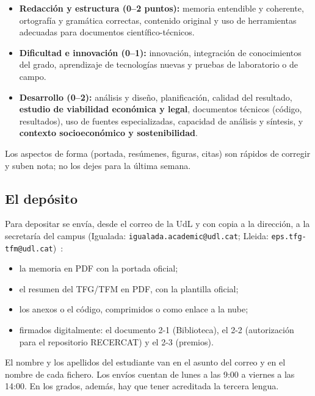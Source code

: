 \documentclass[11pt,a4paper]{article}
\begin{document}
\begin{itemize}
  \item \textbf{Redacción y estructura (0--2 puntos):} memoria entendible y
        coherente, ortografía y gramática correctas, contenido original y uso
        de herramientas adecuadas para documentos científico-técnicos.
  \item \textbf{Dificultad e innovación (0--1):} innovación, integración de
        conocimientos del grado, aprendizaje de tecnologías nuevas y pruebas de
        laboratorio o de campo.
  \item \textbf{Desarrollo (0--2):} análisis y diseño, planificación, calidad
        del resultado, \textbf{estudio de viabilidad económica y legal},
        documentos técnicos (código, resultados), uso de fuentes especializadas,
        capacidad de análisis y síntesis, y \textbf{contexto socioeconómico y
        sostenibilidad}.
\end{itemize}

Los aspectos de forma (portada, resúmenes, figuras, citas) son rápidos de
corregir y suben nota; no los dejes para la última semana.

\subsection{El depósito}

Para depositar se envía, desde el correo de la UdL y con copia a la dirección,
a la secretaría del campus (Igualada: \texttt{igualada.academic@udl.cat}; Lleida:
\texttt{eps.tfg-tfm@udl.cat})~\cite{eps_terminis2025}:

\begin{itemize}
  \item la memoria en PDF con la portada oficial;
  \item el resumen del TFG/TFM en PDF, con la plantilla oficial;
  \item los anexos o el código, comprimidos o como enlace a la nube;
  \item firmados digitalmente: el documento 2-1 (Biblioteca), el 2-2
        (autorización para el repositorio RECERCAT) y el 2-3 (premios).
\end{itemize}

El nombre y los apellidos del estudiante van en el asunto del correo y en el
nombre de cada fichero. Los envíos cuentan de lunes a las 9:00 a viernes a las
14:00. En los grados, además, hay que tener acreditada la tercera lengua.

\end{document}
